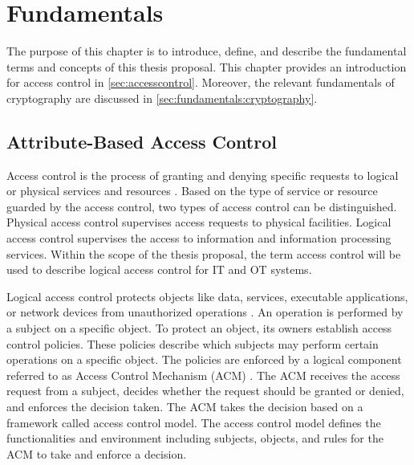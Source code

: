 \chapter{Fundamentals}
\label{ch:fundamentals}
The purpose of this chapter is to introduce, define, and describe the fundamental terms and concepts of this thesis proposal.
This chapter provides an introduction for access control in \autoref{sec:accesscontrol}.
Moreover, the relevant fundamentals of cryptography are discussed in \autoref{sec:fundamentals:cryptography}.

\section{Attribute-Based Access Control}
\label{sec:accesscontrol}
Access control is the process of granting and denying specific requests to logical or physical services and resources \cite{NIST2022}.
Based on the type of service or resource guarded by the access control, two types of access control can be distinguished.
Physical access control supervises access requests to physical facilities.
Logical access control supervises the access to information and information processing services.
Within the scope of the thesis proposal, the term access control will be used to describe logical access control for IT and OT systems.

Logical access control protects objects like data, services, executable applications, or network devices from unauthorized operations \cite{Hu2014}.
An operation is performed by a subject on a specific object.
To protect an object, its owners establish access control policies.
These policies describe which subjects may perform certain operations on a specific object.
The policies are enforced by a logical component referred to as Access Control Mechanism (ACM) \cite{Hu2014}.
The ACM receives the access request from a subject, decides whether the request should be granted or denied, and enforces the decision taken.
The ACM takes the decision based on a framework called access control model.
The access control model defines the functionalities and environment including subjects, objects, and rules for the ACM to take and enforce a decision.


